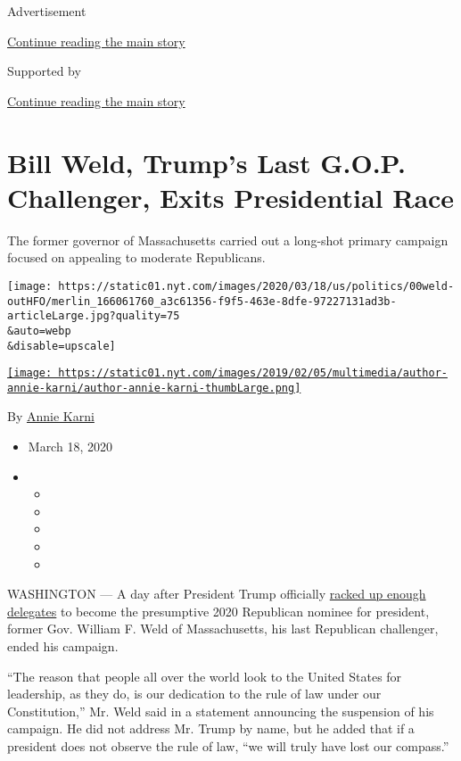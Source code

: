 Advertisement

\protect\hyperlink{after-top}{Continue reading the main story}

Supported by

\protect\hyperlink{after-sponsor}{Continue reading the main story}

\hypertarget{bill-weld-trumps-last-gop-challenger-exits-presidential-race}{%
\section{Bill Weld, Trump's Last G.O.P. Challenger, Exits Presidential
Race}\label{bill-weld-trumps-last-gop-challenger-exits-presidential-race}}

The former governor of Massachusetts carried out a long-shot primary
campaign focused on appealing to moderate Republicans.

\texttt{[image: https://static01.nyt.com/images/2020/03/18/us/politics/00weld-outHFO/merlin\_166061760\_a3c61356-f9f5-463e-8dfe-97227131ad3b-articleLarge.jpg?quality=75\\\&auto=webp\\\&disable=upscale]}

\href{https://www.nytimes.com/by/annie-karni}{\texttt{[image: https://static01.nyt.com/images/2019/02/05/multimedia/author-annie-karni/author-annie-karni-thumbLarge.png]}}

By \href{https://www.nytimes.com/by/annie-karni}{Annie Karni}

\begin{itemize}
\item
  March 18, 2020
\item
  \begin{itemize}
  \item
  \item
  \item
  \item
  \item
  \end{itemize}
\end{itemize}

WASHINGTON --- A day after President Trump officially
\href{https://www.nytimes.com/2020/03/17/us/politics/march-17-democratic-primary.html}{racked
up enough delegates} to become the presumptive 2020 Republican nominee
for president, former Gov. William F. Weld of Massachusetts, his last
Republican challenger, ended his campaign.

``The reason that people all over the world look to the United States
for leadership, as they do, is our dedication to the rule of law under
our Constitution,'' Mr. Weld said in a statement announcing the
suspension of his campaign. He did not address Mr. Trump by name, but he
added that if a president does not observe the rule of law, ``we will
truly have lost our compass.''

